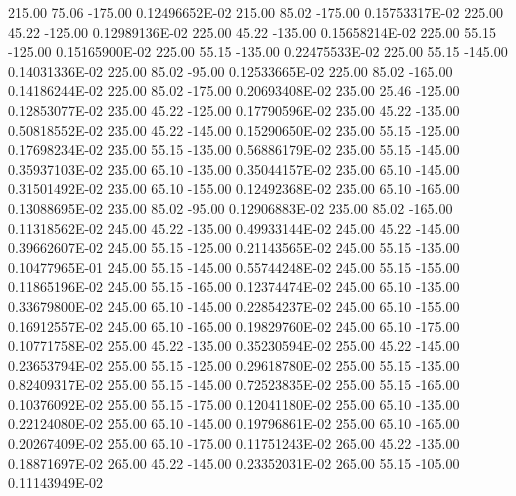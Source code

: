      215.00      75.06    -175.00      0.12496652E-02
     215.00      85.02    -175.00      0.15753317E-02
     225.00      45.22    -125.00      0.12989136E-02
     225.00      45.22    -135.00      0.15658214E-02
     225.00      55.15    -125.00      0.15165900E-02
     225.00      55.15    -135.00      0.22475533E-02
     225.00      55.15    -145.00      0.14031336E-02
     225.00      85.02     -95.00      0.12533665E-02
     225.00      85.02    -165.00      0.14186244E-02
     225.00      85.02    -175.00      0.20693408E-02
     235.00      25.46    -125.00      0.12853077E-02
     235.00      45.22    -125.00      0.17790596E-02
     235.00      45.22    -135.00      0.50818552E-02
     235.00      45.22    -145.00      0.15290650E-02
     235.00      55.15    -125.00      0.17698234E-02
     235.00      55.15    -135.00      0.56886179E-02
     235.00      55.15    -145.00      0.35937103E-02
     235.00      65.10    -135.00      0.35044157E-02
     235.00      65.10    -145.00      0.31501492E-02
     235.00      65.10    -155.00      0.12492368E-02
     235.00      65.10    -165.00      0.13088695E-02
     235.00      85.02     -95.00      0.12906883E-02
     235.00      85.02    -165.00      0.11318562E-02
     245.00      45.22    -135.00      0.49933144E-02
     245.00      45.22    -145.00      0.39662607E-02
     245.00      55.15    -125.00      0.21143565E-02
     245.00      55.15    -135.00      0.10477965E-01
     245.00      55.15    -145.00      0.55744248E-02
     245.00      55.15    -155.00      0.11865196E-02
     245.00      55.15    -165.00      0.12374474E-02
     245.00      65.10    -135.00      0.33679800E-02
     245.00      65.10    -145.00      0.22854237E-02
     245.00      65.10    -155.00      0.16912557E-02
     245.00      65.10    -165.00      0.19829760E-02
     245.00      65.10    -175.00      0.10771758E-02
     255.00      45.22    -135.00      0.35230594E-02
     255.00      45.22    -145.00      0.23653794E-02
     255.00      55.15    -125.00      0.29618780E-02
     255.00      55.15    -135.00      0.82409317E-02
     255.00      55.15    -145.00      0.72523835E-02
     255.00      55.15    -165.00      0.10376092E-02
     255.00      55.15    -175.00      0.12041180E-02
     255.00      65.10    -135.00      0.22124080E-02
     255.00      65.10    -145.00      0.19796861E-02
     255.00      65.10    -165.00      0.20267409E-02
     255.00      65.10    -175.00      0.11751243E-02
     265.00      45.22    -135.00      0.18871697E-02
     265.00      45.22    -145.00      0.23352031E-02
     265.00      55.15    -105.00      0.11143949E-02
